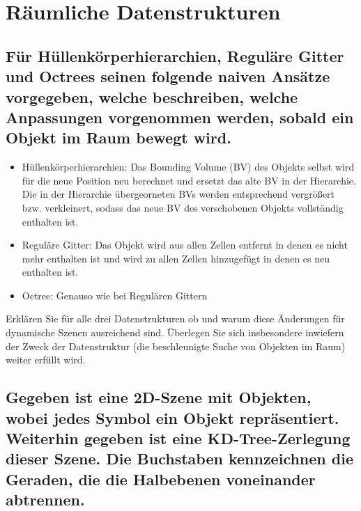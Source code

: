 \documentclass[a4paper,10pt,DIV=14]{scrartcl}
\begin{document}
\section{Räumliche Datenstrukturen}

\subsection{Für Hüllenkörperhierarchien, Reguläre Gitter und Octrees seinen folgende naiven Ansätze vorgegeben, welche beschreiben, welche Anpassungen vorgenommen werden, sobald ein Objekt im Raum bewegt wird.}

\begin{itemize}
	\item Hüllenkörperhierarchien: Das Bounding Volume (BV) des Objekts selbst wird für die neue Position neu berechnet und ersetzt das alte BV in der Hierarchie. Die in der Hierarchie übergeorneten BVs werden entsprechend vergrößert bzw. verkleinert, sodass das neue BV des verschobenen Objekts vollständig enthalten ist.
	\item Reguläre Gitter: Das Objekt wird aus allen Zellen entfernt in denen es nicht mehr enthalten ist und wird zu allen Zellen hinzugefügt in denen es neu enthalten ist.
	\item Octree: Genauso wie bei Regulären Gittern
\end{itemize}

Erklären Sie für alle drei Datenstrukturen ob und warum diese Änderungen für dynamische Szenen ausreichend sind. Überlegen Sie sich insbesondere inwiefern der Zweck der Datenstruktur (die beschleunigte Suche von Objekten im Raum) weiter erfüllt wird.

\subsection{Gegeben ist eine 2D-Szene mit Objekten, wobei jedes Symbol ein Objekt repräsentiert. Weiterhin gegeben ist eine KD-Tree-Zerlegung dieser Szene. Die Buchstaben kennzeichnen die Geraden, die die Halbebenen voneinander abtrennen.}
\end{document}
